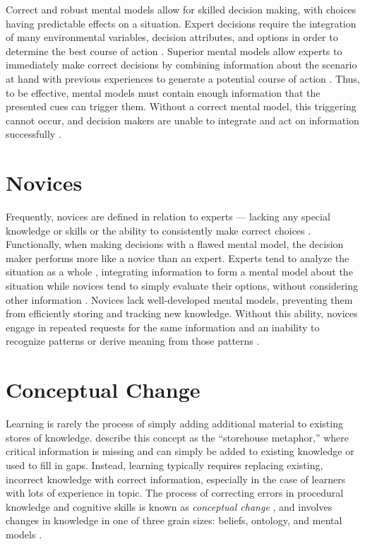Correct and robust mental models allow for skilled decision making, with choices having predictable effects on a situation. Expert decisions require the integration of many environmental variables, decision attributes, and options in order to determine the best course of action \citep{Klein2008}. Superior mental models allow experts to immediately make correct decisions \citep{Klein1992} by combining information about the scenario at hand with previous experiences to generate a potential course of action \citep{Klein1999}. Thus, to be effective, mental models must contain enough information that the presented cues can trigger them. Without a correct mental model, this triggering cannot occur, and decision makers are unable to integrate and act on information successfully \citep{Lipshitz1997}.

\section{Novices}

Frequently, novices are defined in relation to experts --- lacking any special knowledge or skills or the ability to consistently make correct choices \citep{Lipshitz1997}. Functionally, when making decisions with a flawed mental model, the decision maker performs more like a novice than an expert. Experts tend to analyze the situation as a whole \citep{Calderwood1990}, integrating information to form a mental model about the situation \citep{Gott1986} while novices tend to simply evaluate their options, without considering other information \citep{Calderwood1990}. Novices lack well-developed mental models, preventing them from efficiently storing and tracking new knowledge. Without this ability, novices engage in repeated requests for the same information \citep{Lipshitz1997} and an inability to recognize patterns \citep{Shanteau1988} or derive meaning from those patterns \citep{Means1993}.

\section{Conceptual Change}
\label{change}

Learning is rarely the process of simply adding additional material to existing stores of knowledge. \citet{Klein2006} describe this concept as the ``storehouse metaphor,'' where critical information is missing and can simply be added to existing knowledge or used to fill in gaps. Instead, learning typically requires replacing existing, incorrect knowledge with correct information, especially in the case of learners with lots of experience in topic. The process of correcting errors in procedural knowledge and cognitive skills is known as \emph{conceptual change} \citep{Chi2008}, and involves changes in knowledge in one of three grain sizes: beliefs, ontology, and mental models \citep{Gadgil2012}.

